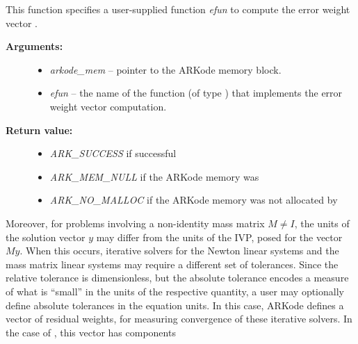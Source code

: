 \documentclass[letterpaper,10pt,english]{sphinxmanual}
\begin{document}
\begin{fulllineitems}
\label{c_interface/User_callable:c.ARKodeWFtolerances}
This function specifies a user-supplied function \emph{efun} to compute
the error weight vector .
\begin{description}
\item[{\textbf{Arguments:}}] \leavevmode\begin{itemize}
\item {} 
\emph{arkode\_mem} -- pointer to the ARKode memory block.

\item {} 
\emph{efun} -- the name of the function (of type {\hyperref[c_interface/User_supplied:c.ARKEwtFn]{\emph{}}})
that implements the error weight vector computation.

\end{itemize}

\item[{\textbf{Return value:}}] \leavevmode\begin{itemize}
\item {} 
\emph{ARK\_SUCCESS} if successful

\item {} 
\emph{ARK\_MEM\_NULL}  if the ARKode memory was 

\item {} 
\emph{ARK\_NO\_MALLOC}  if the ARKode memory was not allocated by {\hyperref[c_interface/User_callable:c.ARKodeInit]{\emph{}}}

\end{itemize}

\end{description}

\end{fulllineitems}


Moreover, for problems involving a non-identity mass matrix
\(M\ne I\), the units of the solution vector \(y\) may differ
from the units of the IVP, posed for the vector \(My\).  When this
occurs, iterative solvers for the Newton linear systems and the mass
matrix linear systems may require a different set of tolerances.
Since the relative tolerance is dimensionless, but the absolute
tolerance encodes a measure of what is ``small'' in the units of the
respective quantity, a user may optionally define absolute tolerances
in the equation units.  In this case, ARKode defines a vector of residual
weights,  for measuring convergence of these iterative solvers.
In the case of {\hyperref[c_interface/User_callable:c.ARKodeResStolerance]{\emph{}}}, this vector has components
\end{document}
